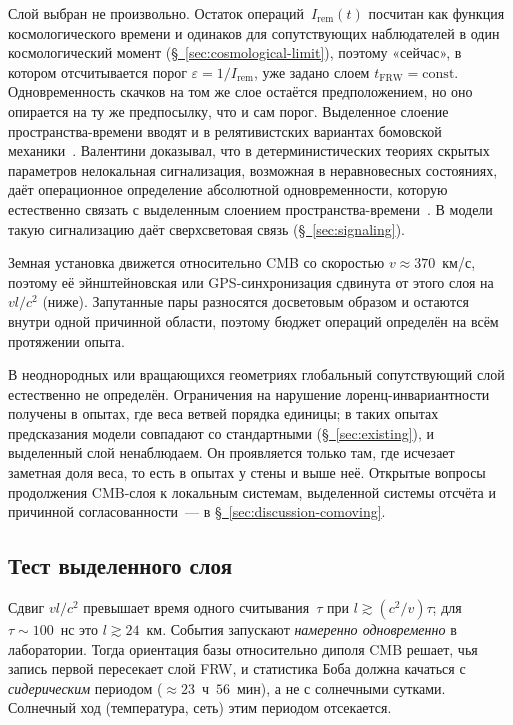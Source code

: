 \documentclass[11pt,a4paper]{article}
\newcommand{\Ost}{I_{\mathrm{rem}}}
\begin{document}
Слой выбран не произвольно. Остаток операций~$\Ost(t)$ посчитан как функция космологического времени и одинаков для сопутствующих наблюдателей в один космологический момент (\hyperref[sec:cosmological-limit]{\S~\ref*{sec:cosmological-limit}}), поэтому «сейчас», в котором отсчитывается порог $\varepsilon=1/\Ost$, уже задано слоем $t_{\mathrm{FRW}}=\mathrm{const}$. Одновременность скачков на том же слое остаётся предположением, но оно опирается на ту же предпосылку, что и сам порог. Выделенное слоение пространства-времени вводят и в релятивистских вариантах бомовской механики~\cite{durr2014}. Валентини доказывал, что в детерминистических теориях скрытых параметров нелокальная сигнализация, возможная в неравновесных состояниях, даёт операционное определение абсолютной одновременности, которую естественно связать с выделенным слоением пространства-времени~\cite{valentini2008}. В модели такую сигнализацию даёт сверхсветовая связь (\hyperref[sec:signaling]{\S~\ref*{sec:signaling}}).

Земная установка движется относительно CMB со скоростью $v\approx370$~км/с, поэтому её эйнштейновская или GPS-синхронизация сдвинута от этого слоя на $vl/c^2$ (ниже). Запутанные пары разносятся досветовым образом и остаются внутри одной причинной области, поэтому бюджет операций определён на всём протяжении опыта.

В неоднородных или вращающихся геометриях глобальный сопутствующий слой естественно не определён. Ограничения на нарушение лоренц-инвариантности~\cite{mattingly2005,liberati2013} получены в опытах, где веса ветвей порядка единицы; в таких опытах предсказания модели совпадают со стандартными (\hyperref[sec:existing]{\S~\ref*{sec:existing}}), и выделенный слой ненаблюдаем. Он проявляется только там, где исчезает заметная доля веса, то есть в опытах у стены и выше неё. Открытые вопросы продолжения CMB-слоя к локальным системам, выделенной системы отсчёта и причинной согласованности~--- в \hyperref[sec:discussion-comoving]{\S~\ref*{sec:discussion-comoving}}.

\subsection{Тест выделенного слоя}
\label{sec:comoving-test}

Сдвиг $vl/c^2$ превышает время одного считывания~$\tau$ при $l\gtrsim(c^2/v)\tau$; для $\tau\sim100$~нс это $l\gtrsim24$~км. События запускают \emph{намеренно одновременно} в лаборатории. Тогда ориентация базы относительно диполя CMB решает, чья запись первой пересекает слой FRW, и статистика Боба должна качаться с \emph{сидерическим} периодом ($\approx23$~ч~$56$~мин), а не с солнечными сутками. Солнечный ход (температура, сеть) этим периодом отсекается.
\end{document}
